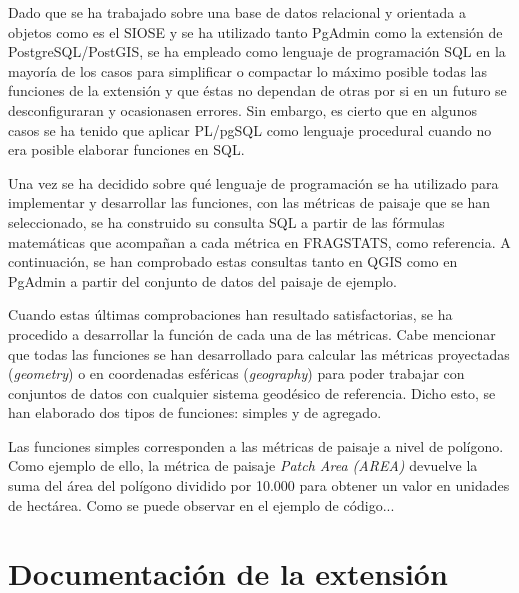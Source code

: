 Dado que se ha trabajado sobre una base de datos relacional y orientada a objetos como es el SIOSE y se ha utilizado tanto PgAdmin como la extensión de PostgreSQL/PostGIS, se ha empleado como lenguaje de programación SQL en la mayoría de los casos para simplificar o compactar lo máximo posible todas las funciones de la extensión y que éstas no dependan de otras por si en un futuro se desconfiguraran y ocasionasen errores. Sin embargo, es cierto que en algunos casos se ha tenido que aplicar PL/pgSQL como lenguaje procedural cuando no era posible elaborar funciones en SQL.

Una vez se ha decidido sobre qué lenguaje de programación se ha utilizado para implementar y desarrollar las funciones, con las métricas de paisaje que se han seleccionado, se ha construido su consulta SQL a partir de las fórmulas matemáticas que acompañan a cada métrica en FRAGSTATS, como referencia. A continuación, se han comprobado estas consultas tanto en QGIS como en PgAdmin a partir del conjunto de datos del paisaje de ejemplo. 

Cuando estas últimas comprobaciones han resultado satisfactorias, se ha procedido a desarrollar la función de cada una de las métricas. Cabe mencionar que todas las funciones se han desarrollado para calcular las métricas proyectadas (\textit{geometry}) o en coordenadas esféricas (\textit{geography}) para poder trabajar con conjuntos de datos con cualquier sistema geodésico de referencia. Dicho esto, se han elaborado dos tipos de funciones: simples y de agregado.

Las funciones simples corresponden a las métricas de paisaje a nivel de polígono. Como ejemplo de ello, la métrica de paisaje \textit{Patch Area (AREA)} devuelve la suma del área del polígono dividido por 10.000 para obtener un valor en unidades de hectárea. Como se puede observar en el ejemplo de código... 








\label{list:tca1}
\label{list:tca2}
\label{list:tca3}


\section{Documentación de la extensión}

